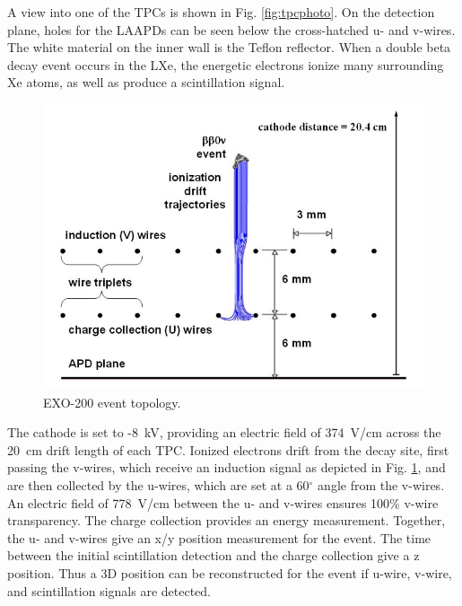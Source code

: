 A view into one of the TPCs is shown in Fig. \ref{fig:tpcphoto}.  On the detection plane, holes for the LAAPDs can be seen below the cross-hatched u- and v-wires.  The white material on the inner wall is the Teflon reflector.  When a double beta decay event occurs in the LXe, the energetic electrons ionize many surrounding Xe atoms, as well as produce a scintillation signal.  %

\begin{figure} %
	\centering
	\includegraphics[width=.7\textwidth]{figures/anodecathodedriftcharges.png}
	\caption{EXO-200 event topology.  }
\label{fig:detectionplane}
\end{figure}

The cathode is set to -8~kV, providing an electric field of 374~V/cm across the 20~cm drift length of each TPC.  Ionized electrons drift from the decay site, first passing the v-wires, which receive an induction signal as depicted in Fig. \ref{fig:detectionplane}, and are then collected by the u-wires, which are set at a 60$^\circ$ angle from the v-wires.  An electric field of 778~V/cm between the u- and v-wires ensures 100\% v-wire transparency.  The charge collection provides an energy measurement.  Together, the u- and v-wires give an x/y position measurement for the event.  The time between the initial scintillation detection and the charge collection give a z position.  Thus a 3D position can be reconstructed for the event if u-wire, v-wire, and scintillation signals are detected.  \cite{EXO200TwoNuLong}  

